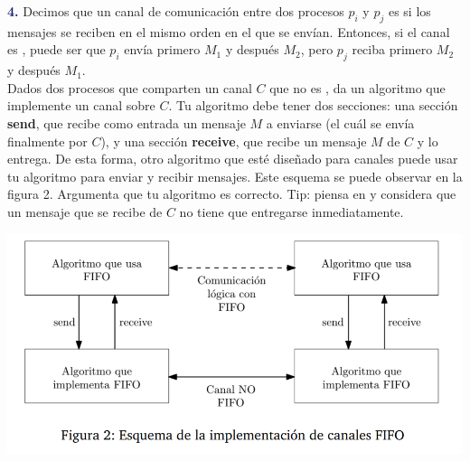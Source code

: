 \newpage
\textbf{\textcolor{MidnightBlue}{4.}}
Decimos que un canal de comunicación entre dos procesos $p_i$ y $p_j$ es  si los
mensajes se reciben en el mismo orden en el que se envían. Entonces, si el canal 
es , puede ser que $p_i$ envía primero $M_1$ y después $M_2$, pero $p_j$
reciba primero $M_2$ y después $M_1$.\\

Dados dos procesos que comparten un canal $C$ que no es , da un algoritmo que
implemente un canal  sobre $C$. Tu algoritmo debe tener dos secciones: una sección
{\bf send}, que recibe como entrada un mensaje $M$ a enviarse (el cuál se envía finalmente
por $C$), y una sección {\bf receive}, que recibe un mensaje $M$ de $C$ y lo entrega. De esta
forma, otro algoritmo que esté diseñado para canales  puede usar tu algoritmo para
enviar y recibir mensajes. Este esquema se puede observar en la figura 2. Argumenta que tu
algoritmo es correcto. Tip: piensa en  y considera que un mensaje que se
recibe de $C$ no tiene que entregarse inmediatamente.

\begin{center}
    \includegraphics[scale=0.5]{Grapho1.png}
    \end{center}
